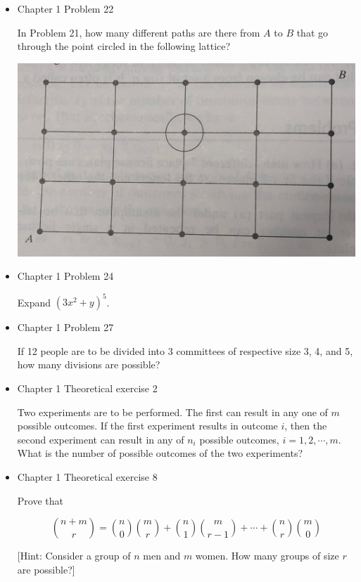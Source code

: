 \documentclass[11pt]{article}
\begin{document}
\begin{itemize}
    \item
    Chapter 1 Problem  22
    
    In Problem 21, how many different paths are there from $A$ to $B$ that go through the point circled in the following lattice?
    
    \begin{center}
   \includegraphics[scale=0.07]{Q22}
   \end{center}

    \item
    Chapter 1 Problem  24

    Expand $(3x^2 + y)^5$.
    
    \item
    Chapter 1 Problem  27
    
    If 12 people are to be divided into 3 committees of respective size 3, 4, and 5, how many divisions are possible?

    \item
    Chapter 1 Theoretical exercise 2
    
    Two experiments are to be performed. The first can result in any one of $m$ possible outcomes. If the first experiment results in outcome $i$, then the second experiment can result in any of $n_i$ possible outcomes, $i = 1, 2, \cdots, m$. What is the number of possible outcomes of the two experiments?

    \item
    Chapter 1 Theoretical exercise 8

    Prove that
    
    $$
    {n+m \choose r} = {n \choose 0}{m \choose r} + {n \choose 1}{m \choose r-1} + \cdots + {n \choose r}{m \choose 0}
    $$
    
    [Hint: Consider a group of $n$ men and $m$ women. How many groups of size $r$ are possible?]
    

\end{itemize}
\end{document}
